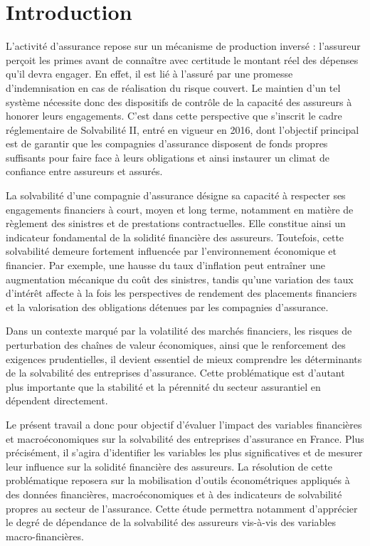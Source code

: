 \documentclass[
]{article}
\author{}
\date{\vspace{-2.5em}}
\begin{document}
\section{Introduction}\label{introduction}

L'activité d'assurance repose sur un mécanisme de production inversé :
l'assureur perçoit les primes avant de connaître avec certitude le
montant réel des dépenses qu'il devra engager. En effet, il est lié à
l'assuré par une promesse d'indemnisation en cas de réalisation du
risque couvert. Le maintien d'un tel système nécessite donc des
dispositifs de contrôle de la capacité des assureurs à honorer leurs
engagements. C'est dans cette perspective que s'inscrit le cadre
réglementaire de Solvabilité II, entré en vigueur en 2016, dont
l'objectif principal est de garantir que les compagnies d'assurance
disposent de fonds propres suffisants pour faire face à leurs
obligations et ainsi instaurer un climat de confiance entre assureurs et
assurés.

La solvabilité d'une compagnie d'assurance désigne sa capacité à
respecter ses engagements financiers à court, moyen et long terme,
notamment en matière de règlement des sinistres et de prestations
contractuelles. Elle constitue ainsi un indicateur fondamental de la
solidité financière des assureurs. Toutefois, cette solvabilité demeure
fortement influencée par l'environnement économique et financier. Par
exemple, une hausse du taux d'inflation peut entraîner une augmentation
mécanique du coût des sinistres, tandis qu'une variation des taux
d'intérêt affecte à la fois les perspectives de rendement des placements
financiers et la valorisation des obligations détenues par les
compagnies d'assurance.

Dans un contexte marqué par la volatilité des marchés financiers, les
risques de perturbation des chaînes de valeur économiques, ainsi que le
renforcement des exigences prudentielles, il devient essentiel de mieux
comprendre les déterminants de la solvabilité des entreprises
d'assurance. Cette problématique est d'autant plus importante que la
stabilité et la pérennité du secteur assurantiel en dépendent
directement.

Le présent travail a donc pour objectif d'évaluer l'impact des variables
financières et macroéconomiques sur la solvabilité des entreprises
d'assurance en France. Plus précisément, il s'agira d'identifier les
variables les plus significatives et de mesurer leur influence sur la
solidité financière des assureurs. La résolution de cette problématique
reposera sur la mobilisation d'outils économétriques appliqués à des
données financières, macroéconomiques et à des indicateurs de
solvabilité propres au secteur de l'assurance. Cette étude permettra
notamment d'apprécier le degré de dépendance de la solvabilité des
assureurs vis-à-vis des variables macro-financières.
\end{document}
